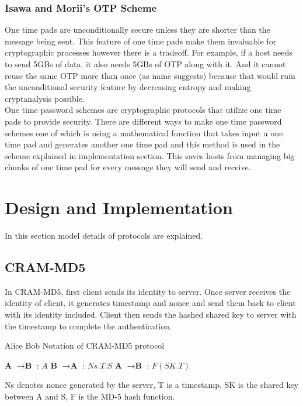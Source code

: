 \documentclass[a4paper, 12pt, titlepage]{article}
\begin{document}
\subsubsection{Isawa and Morii's OTP Scheme}
One time pads are unconditionally secure unless they are shorter than the message being sent. This feature of one time pads make them invaluable for cryptographic processes however there is a tradeoff. For example, if a host needs to send 5GBs of data, it also needs 5GBs of OTP along with it. And it cannot reuse the same OTP more than once (as name suggests) because that would ruin the unconditional security feature by decreasing entropy and making cryptanalysis possible.
\bigskip
\\ One time password schemes are cryptographic protocols that utilize one time pads to provide security. There are different ways to make one time password schemes one of which is using a mathematical function that takes input a one time pad and generates another one time pad \cite{otparticle} and this method is used in the scheme explained in implementation section. This saves hosts from managing big chunks of one time pad for every message they will send and receive.
\newpage
\section{Design and Implementation}
In this section model details of protocols are explained.
\subsection{CRAM-MD5}
In CRAM-MD5, first client sends its identity to server. Once server receives the identity of client, it generates timestamp and nonce and send them back to client with its identity included. Client then sends the hashed shared key to server with the timestamp to complete the authentication.
\begin{algorithm}[H]
    \caption{Alice Bob Notation of CRAM-MD5 protocol \cite{avcram}}
    \label{algo:cram}
    \begin{algorithmic}[1]
        \State \textbf{A} $ \rightarrow \textbf{B} $ : $A$
        \State \textbf{B} $ \rightarrow \textbf{A} $ : $ Ns.T.S $
        \State \textbf{A} $ \rightarrow \textbf{B} $ : $ F(SK.T) $
    \end{algorithmic}
\end{algorithm}
Ns denotes nonce generated by the server, T is a timestamp, SK is the shared key between A and S, F is the MD-5 hash function.
\end{document}
